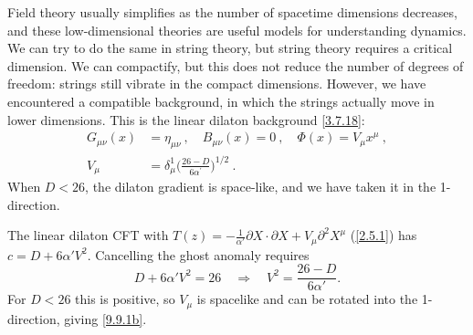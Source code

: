 Field theory usually simplifies as the number of spacetime dimensions decreases, and these low-dimensional theories are useful models for understanding dynamics. We can try to do the same in string theory, but string theory requires a critical dimension. 
We can compactify, but this does not reduce the number of degrees of freedom: strings still vibrate in the compact dimensions. However, we have encountered a compatible background, in which the strings actually move in lower dimensions.
This is the linear dilaton background \eqref{3.7.18}:
\begin{subequations} \label{9.9.1}
	\begin{align}
		G_{\mu \nu}(x) &= \eta_{\mu \nu} \:, \quad B_{\mu \nu}(x) = 0 \:, \quad \Phi(x)=V_{\mu} x^{\mu}  \:, \label{9.9.1a}	\\
		V_{\mu} &= \delta_{\mu}^{1} \biggl(\frac{26-D}{6 \alpha^{\prime}}\biggr)^{1/2} \:.
		\label{9.9.1b}
	\end{align}
\end{subequations}
When $D<26$, the dilaton gradient is space-like, and we have taken it in the 1-direction.
\begin{tcolorbox}[breakable]
	\begin{remark}
		The linear dilaton CFT with $T(z)=-\frac{1}{\alpha'}\partial X\cdot\partial X+V_\mu\partial^2X^\mu$ (\eqref{2.5.1}) has $c=D+6\alpha'V^2$. Cancelling the ghost anomaly requires
		\begin{equation*}
			D+6\alpha'V^2=26\quad\Longrightarrow\quad V^2=\frac{26-D}{6\alpha'} .
		\end{equation*}
		For $D<26$ this is positive, so $V_\mu$ is spacelike and can be rotated into the 1-direction, giving \eqref{9.9.1b}.
	\end{remark}
\end{tcolorbox}

